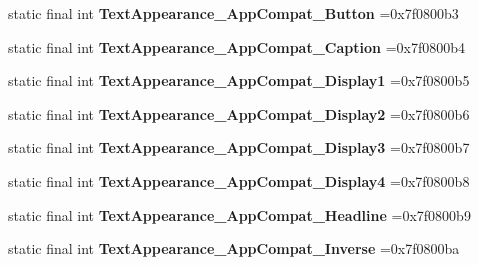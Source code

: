 \begin{DoxyCompactItemize}
\item 
\hypertarget{classcheck_1_1test_1_1_r_1_1style_a168b1e7ee75139dd7f42e5e529ab6ef1}{}static final int {\bfseries Text\+Appearance\+\_\+\+App\+Compat\+\_\+\+Button} =0x7f0800b3\label{classcheck_1_1test_1_1_r_1_1style_a168b1e7ee75139dd7f42e5e529ab6ef1}

\item 
\hypertarget{classcheck_1_1test_1_1_r_1_1style_a166c52deec9bf094a2035888db3c50a5}{}static final int {\bfseries Text\+Appearance\+\_\+\+App\+Compat\+\_\+\+Caption} =0x7f0800b4\label{classcheck_1_1test_1_1_r_1_1style_a166c52deec9bf094a2035888db3c50a5}

\item 
\hypertarget{classcheck_1_1test_1_1_r_1_1style_a3e55dedd453d3687b5887d6ecaec8692}{}static final int {\bfseries Text\+Appearance\+\_\+\+App\+Compat\+\_\+\+Display1} =0x7f0800b5\label{classcheck_1_1test_1_1_r_1_1style_a3e55dedd453d3687b5887d6ecaec8692}

\item 
\hypertarget{classcheck_1_1test_1_1_r_1_1style_a8d9e693af35a8e4b26f7473eb1909bf7}{}static final int {\bfseries Text\+Appearance\+\_\+\+App\+Compat\+\_\+\+Display2} =0x7f0800b6\label{classcheck_1_1test_1_1_r_1_1style_a8d9e693af35a8e4b26f7473eb1909bf7}

\item 
\hypertarget{classcheck_1_1test_1_1_r_1_1style_a4b5d6fbbdf9911a8401cd5060332efd6}{}static final int {\bfseries Text\+Appearance\+\_\+\+App\+Compat\+\_\+\+Display3} =0x7f0800b7\label{classcheck_1_1test_1_1_r_1_1style_a4b5d6fbbdf9911a8401cd5060332efd6}

\item 
\hypertarget{classcheck_1_1test_1_1_r_1_1style_ab71984a9e27e177f414568f02d0d78db}{}static final int {\bfseries Text\+Appearance\+\_\+\+App\+Compat\+\_\+\+Display4} =0x7f0800b8\label{classcheck_1_1test_1_1_r_1_1style_ab71984a9e27e177f414568f02d0d78db}

\item 
\hypertarget{classcheck_1_1test_1_1_r_1_1style_ae0844c820ba1dfb0ddfcb52bcca6ebfb}{}static final int {\bfseries Text\+Appearance\+\_\+\+App\+Compat\+\_\+\+Headline} =0x7f0800b9\label{classcheck_1_1test_1_1_r_1_1style_ae0844c820ba1dfb0ddfcb52bcca6ebfb}

\item 
\hypertarget{classcheck_1_1test_1_1_r_1_1style_a84358f761663f18c1f660c47cc09543d}{}static final int {\bfseries Text\+Appearance\+\_\+\+App\+Compat\+\_\+\+Inverse} =0x7f0800ba\label{classcheck_1_1test_1_1_r_1_1style_a84358f761663f18c1f660c47cc09543d}


\end{DoxyCompactItemize}
